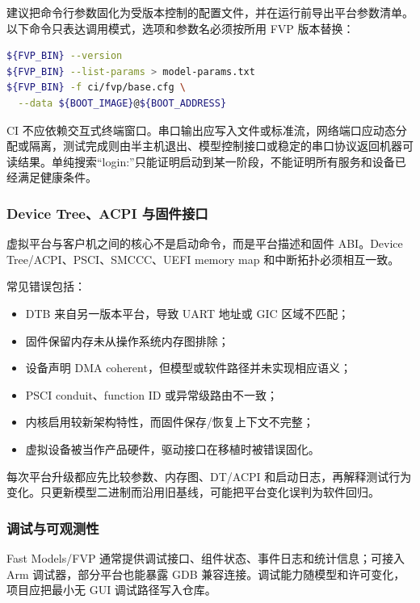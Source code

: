 建议把命令行参数固化为受版本控制的配置文件，并在运行前导出平台参数清单。以下命令只表达调用模式，选项和参数名必须按所用 FVP 版本替换：

\begin{lstlisting}[language=bash,caption={固定虚拟平台运行输入的示意流程}]
${FVP_BIN} --version
${FVP_BIN} --list-params > model-params.txt
${FVP_BIN} -f ci/fvp/base.cfg \
  --data ${BOOT_IMAGE}@${BOOT_ADDRESS}
\end{lstlisting}

CI 不应依赖交互式终端窗口。串口输出应写入文件或标准流，网络端口应动态分配或隔离，测试完成则由半主机退出、模型控制接口或稳定的串口协议返回机器可读结果。单纯搜索“login:”只能证明启动到某一阶段，不能证明所有服务和设备已经满足健康条件。

\subsubsection{Device Tree、ACPI 与固件接口}

虚拟平台与客户机之间的核心不是启动命令，而是平台描述和固件 ABI。Device Tree/ACPI、PSCI、SMCCC、UEFI memory map 和中断拓扑必须相互一致。

常见错误包括：

\begin{itemize}
  \item DTB 来自另一版本平台，导致 UART 地址或 GIC 区域不匹配；
  \item 固件保留内存未从操作系统内存图排除；
  \item 设备声明 DMA coherent，但模型或软件路径并未实现相应语义；
  \item PSCI conduit、function ID 或异常级路由不一致；
  \item 内核启用较新架构特性，而固件保存/恢复上下文不完整；
  \item 虚拟设备被当作产品硬件，驱动接口在移植时被错误固化。
\end{itemize}

每次平台升级都应先比较参数、内存图、DT/ACPI 和启动日志，再解释测试行为变化。只更新模型二进制而沿用旧基线，可能把平台变化误判为软件回归。

\subsubsection{调试与可观测性}

Fast Models/FVP 通常提供调试接口、组件状态、事件日志和统计信息；可接入 Arm 调试器，部分平台也能暴露 GDB 兼容连接。调试能力随模型和许可变化，项目应把最小无 GUI 调试路径写入仓库。

